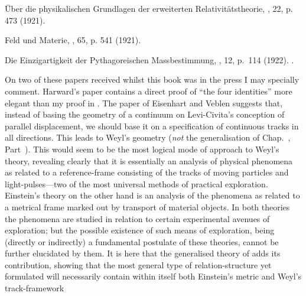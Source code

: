 \documentclass[12pt]{book}
\begin{document}
 Über die physikalischen Grundlagen der erweiterten Relativitätstheorie, , 22, p. 473 (1921).

\Bibitem{\Same} Feld und Materie, , 65, p. 541 (1921).

\Bibitem{\Same} Die Einzigartigkeit der Pythagoreischen Massbestimmung, , 12, p.~114
(1922). \SecRef{97}.
\medskip

On two of these papers received whilst this book was in the press I may specially
comment. Harward's paper contains a direct proof of ``the four identities'' more elegant
than my proof in \SecRef{52}. The paper of Eisenhart and Veblen suggests that, instead of basing
the geometry of a continuum on Levi-Civita's conception of parallel displacement, we should
base it on a specification of continuous tracks in all directions. This leads to Weyl's geometry
\PageSep{243}
(\emph{not} the generalisation of Chap.~, Part~). This would seem to be the most logical mode
of approach to Weyl's theory, revealing clearly that it is essentially an analysis of physical
phenomena as related to a reference-frame consisting of the tracks of moving particles and
light-pulses---two of the most universal methods of practical exploration. Einstein's theory
on the other hand is an analysis of the phenomena as related to a metrical frame marked
out by transport of material objects. In both theories the phenomena are studied in relation
to certain experimental avenues of exploration; but the possible existence of such means
of exploration, being (directly or indirectly) a fundamental postulate of these theories,
cannot be further elucidated by them. It is here that the generalised theory of  adds
its contribution, showing that the most general type of relation-structure yet formulated
will necessarily contain within itself both Einstein's metric and Weyl's track-framework
\PageSep{244}

\printindex
\end{document}
